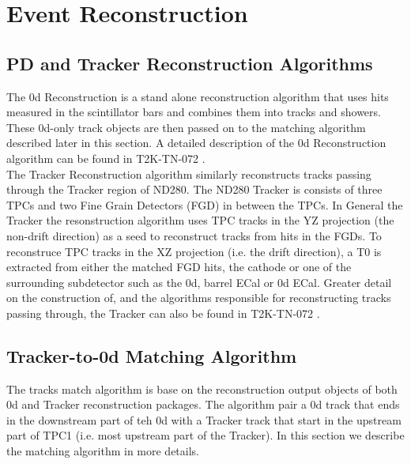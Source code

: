 \clearpage
\section{Event Reconstruction}
\label{sec:EventReconstruction}

\subsection{PD and Tracker Reconstruction Algorithms}

The \p0d Reconstruction is a stand alone reconstruction algorithm 
that uses hits measured in the scintillator bars and combines them 
into tracks and showers. 
These \p0d-only track objects are then passed on to the matching 
algorithm described later in this section. 
A detailed description of the \p0d Reconstruction algorithm 
can be found in T2K-TN-072 \cite{tn72}. \\

The Tracker Reconstruction algorithm 
similarly reconstructs tracks passing through the Tracker region of ND280. 
The ND280 Tracker is consists of three TPCs and two Fine Grain Detectors (FGD) 
in between the TPCs. 
In General the Tracker 
the resonstruction algorithm uses TPC tracks 
in the YZ projection (the non-drift direction) 
as a seed to reconstruct tracks from hits in the FGDs. 
To reconstruce TPC tracks in the XZ projection 
(i.e. the drift direction), 
a T0 is extracted from either the matched FGD hits, the cathode 
or one of the surrounding subdetector 
such as the \p0d, barrel ECal or \p0d ECal. 
Greater detail on the construction of, and the algorithms responsible 
for reconstructing tracks passing through, 
the Tracker can also be found in T2K-TN-072 \cite{tn72}.

\subsection{Tracker-to-\p0d Matching Algorithm}
\label{sec:MatchingAlgorithm}

The tracks match algorithm is base on the reconstruction output objects of 
both \p0d and Tracker reconstruction packages.
The algorithm pair a \p0d track that ends in the downstream part of teh \p0d with a Tracker track that start in the upstream part of TPC1 
(i.e. most upstream part of the Tracker).
%
In this section we describe the matching algorithm in more details.

